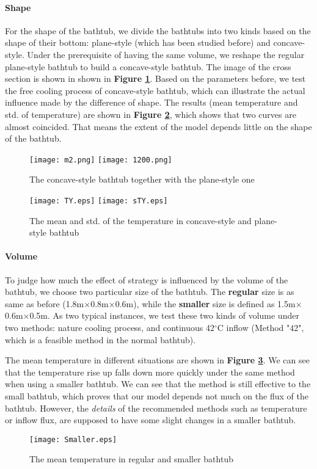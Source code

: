 \documentclass[12pt]{article}
\begin{document}
\paragraph{Shape}For the shape of the bathtub, we divide the bathtubs into two kinds based on the
shape of their bottom: plane-style (which has been studied before) and concave-style. Under the
prerequisite of having the same volume, we reshape the regular plane-style bathtub to build a
concave-style bathtub. The image of the cross section is shown in shown in \textbf{Figure
\ref{bathtub}}. Based on the parameters before, we test the free cooling process of concave-style
bathtub, which can illustrate the actual influence made by the difference of shape. The results
(mean temperature and std. of temperature) are shown in \textbf{Figure \ref{s4}}, which shows that
two curves are almost coincided. That means the extent of the model depends little on the shape of
the bathtub.
\begin{figure}[!htbp]
\small
\centering
\texttt{[image: m2.png]}
\texttt{[image: 1200.png]}
\caption{The concave-style bathtub together with the plane-style one}\label{bathtub}
\end{figure}

\begin{figure}[!htbp]
\small
\centering
\texttt{[image: TY.eps]}
\texttt{[image: sTY.eps]}
\caption{The mean and std. of the temperature in concave-style and plane-style bathtub}\label{s4}
\end{figure}


\paragraph{Volume}To judge how much the effect of strategy is influenced by the volume of the
bathtub, we choose two particular size of the bathtub. The \textbf{regular} size is as same as
before (1.8m$\times$0.8m$\times$0.6m), while the \textbf{smaller} size is defined as
1.5m$\times$0.6m$\times$0.5m. As two typical instances, we test these two kinds of volume under two
methods: nature cooling process, and continuous 42$^\circ$C inflow (Method "42", which is a feasible
method in the normal bathtub).

The mean temperature in different situations are shown in \textbf{Figure \ref{s5}}. We can see that
the temperature rise up falls down more quickly under the same method when using a smaller bathtub.
We can see that the method is still effective to the small bathtub, which proves that our model
depends not much on the flux of the bathtub. However, the \emph{details} of the recommended methods
such as temperature or inflow flux, are supposed to have some slight changes in a smaller bathtub.
\begin{figure}[!htbp]
\small
\centering
\texttt{[image: Smaller.eps]}
\caption{The mean temperature in regular and smaller bathtub}\label{s5}
\end{figure}
\end{document}
